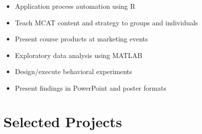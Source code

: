\documentclass{tccv_AH}
\begin{document}
\iffalse
\begin{joblist}

\item{Feb 2014 - Jul 2014}
     {Walden University School of Nursing}
     {Field Education}

\item{Oct 2012 - Aug 2013}
     {Kaplan Test Preparation}
     {MCAT Instructor/Tutor}

\item{Aug 2009 - Aug 2012}
     {Lab of Neuropsychology, NIMH}
     {Animal Biologist}
\end{joblist}
\fi

\begin{itemize}
    \itemsep-0.25em
    \item{Application process automation using R}
\end{itemize}

\medskip

\begin{itemize}
    \itemsep-0.25em
    \item{Teach MCAT content and strategy to groups and individuals}
    \item{Present course products at marketing events}
\end{itemize}

\medskip

\begin{itemize}
    \itemsep-0.25em
    \item{Exploratory data analysis using MATLAB}
    \item{Design/execute behavioral experiments}
    \item{Present findings in PowerPoint and poster formats}
\end{itemize}


\vfill



\section{Selected Projects}
\end{document}
